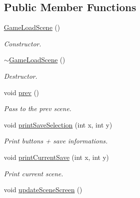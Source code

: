 \subsection*{Public Member Functions}
\begin{DoxyCompactItemize}
\item 
\hyperlink{classGameLoadScene_a225786d3826577aa3743164b6262dc2b}{Game\+Load\+Scene} ()
\begin{DoxyCompactList}\small\item\em Constructor. \end{DoxyCompactList}\item 
\hyperlink{classGameLoadScene_a39c0f378455520c08d21e0642f35cd9b}{$\sim$\+Game\+Load\+Scene} ()
\begin{DoxyCompactList}\small\item\em Destructor. \end{DoxyCompactList}\item 
\mbox{\label{classGameLoadScene_a4d2c3a0455cd070671dbef281b7bd87f}} 
void \hyperlink{classGameLoadScene_a4d2c3a0455cd070671dbef281b7bd87f}{prev} ()
\begin{DoxyCompactList}\small\item\em Pass to the prev scene. \end{DoxyCompactList}\item 
\mbox{\label{classGameLoadScene_a5e7ed12e23f55803a38861435f291a2a}} 
void \hyperlink{classGameLoadScene_a5e7ed12e23f55803a38861435f291a2a}{print\+Save\+Selection} (int x, int y)
\begin{DoxyCompactList}\small\item\em Print buttons + save informations. \end{DoxyCompactList}\item 
\mbox{\label{classGameLoadScene_aa0fc8ae7c6033f97134998ee9bb7b72c}} 
void \hyperlink{classGameLoadScene_aa0fc8ae7c6033f97134998ee9bb7b72c}{print\+Current\+Save} (int x, int y)
\begin{DoxyCompactList}\small\item\em Print current scene. \end{DoxyCompactList}\item 
\mbox{\label{classGameLoadScene_a6756230cb8d4893bbe36e0f41a242eb3}} 
void \hyperlink{classGameLoadScene_a6756230cb8d4893bbe36e0f41a242eb3}{update\+Scene\+Screen} ()

\end{DoxyCompactItemize}
